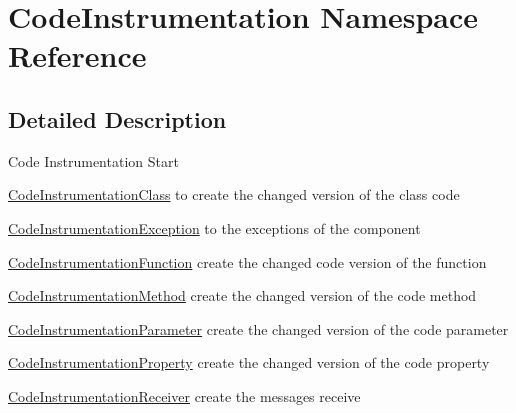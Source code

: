 \hypertarget{namespace_code_instrumentation}{
\section{CodeInstrumentation Namespace Reference}
\label{namespace_code_instrumentation}
}


\subsection{Detailed Description}
Code Instrumentation Start

\hyperlink{class_code_instrumentation_class}{CodeInstrumentationClass} to create the changed version of the class code

\hyperlink{class_code_instrumentation_exception}{CodeInstrumentationException} to the exceptions of the component

\hyperlink{class_code_instrumentation_function}{CodeInstrumentationFunction} create the changed code version of the function

\hyperlink{class_code_instrumentation_method}{CodeInstrumentationMethod} create the changed version of the code method

\hyperlink{class_code_instrumentation_parameter}{CodeInstrumentationParameter} create the changed version of the code parameter

\hyperlink{class_code_instrumentation_property}{CodeInstrumentationProperty} create the changed version of the code property

\hyperlink{class_code_instrumentation_receiver}{CodeInstrumentationReceiver} create the messages receive 

